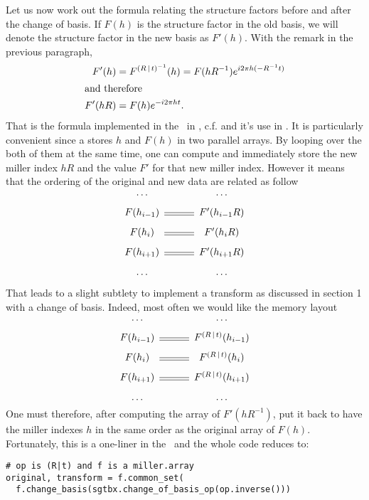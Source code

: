 \documentclass[11pt]{article}
\begin{document}
Let us now work out the formula relating the structure factors before and after the change of basis. If $F(h)$ is the structure factor in the old basis, we will denote the structure factor in the new basis as $F'(h)$. With the remark in the previous paragraph,
\begin{align}
F'(h) &= F^{\left( R\,\vert\, t \right)^{-1}}(h) = F(hR^{-1}) e^{i2\pi h(-R^{-1}t)}\nonumber\\
\intertext{and therefore}
F'(hR) &= F(h)e^{-i2\pi ht}. \label{change::basis::F}
\end{align}
That is the formula implemented in the \cctbx\ in , c.f.  and it's use in . It is particularly convenient since a  stores $h$ and $F(h)$ in two parallel arrays. By looping over the both of them at the same time, one can compute and immediately store the new miller index $hR$ and the value $F'$ for that new miller index. However it means that the ordering of the original and new data are related as follow
\begin{equation}
\begin{CD}
\ldots @. \ldots\\
F(h_{i-1}) @= F'(h_{i-1}R)\\
F(h_i) @= F'(h_iR)\\
F(h_{i+1}) @= F'(h_{i+1}R)\\
\ldots @. \ldots
\end{CD}
\label{miller::array::change::basis}
\end{equation}

That leads to a slight subtlety to implement a transform as discussed in section 1 with a change of basis. Indeed, most often we would like the memory layout
\begin{equation}
\begin{CD}
\ldots @. \ldots\\
F(h_{i-1}) @= F^{\sym{R}{t}}(h_{i-1})\\
F(h_i) @= F^{\sym{R}{t}}(h_i)\\
F(h_{i+1}) @= F^{\sym{R}{t}}(h_{i+1})\\
\ldots @. \ldots
\end{CD}
\label{miller::array::transform}
\end{equation}
One must therefore, after computing the array of $F'(hR^{-1})$, put it back to have the miller indexes $h$ in the same order as the original array of $F(h)$. Fortunately, this is a one-liner in the \cctbx\ and the whole code reduces to:
\begin{verbatim}
# op is (R|t) and f is a miller.array
original, transform = f.common_set(
  f.change_basis(sgtbx.change_of_basis_op(op.inverse()))
\end{verbatim}
\end{document}

